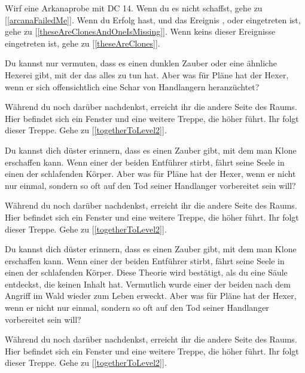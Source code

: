 Wirf eine Arkanaprobe mit DC 14. Wenn du es nicht schaffst, gehe zu [\ref{arcanaFailedMe}]. Wenn du Erfolg hast, und das Ereignis ,  oder  eingetreten ist, gehe zu [\ref{theseAreClonesAndOneIsMissing}]. Wenn keins dieser Ereignisse eingetreten ist, gehe zu [\ref{theseAreClones}].


Du kannst nur vermuten, dass es einen dunklen Zauber oder eine ähnliche Hexerei gibt, mit der das alles zu tun hat. Aber was für Pläne hat der Hexer, wenn er sich offensichtlich eine Schar von Handlangern heranzüchtet?

Während du noch darüber nachdenkst, erreicht ihr die andere Seite des Raums. Hier befindet sich ein Fenster und eine weitere Treppe, die höher führt. Ihr folgt dieser Treppe.
Gehe zu [\ref{togetherToLevel2}].


Du kannst dich düster erinnern, dass es einen Zauber gibt, mit dem man Klone erschaffen kann. Wenn einer der beiden Entführer stirbt, fährt seine Seele in einen der schlafenden Körper. Aber was für Pläne hat der Hexer, wenn er nicht nur einmal, sondern so oft auf den Tod seiner Handlanger vorbereitet sein will?

Während du noch darüber nachdenkst, erreicht ihr die andere Seite des Raums. Hier befindet sich ein Fenster und eine weitere Treppe, die höher führt. Ihr folgt dieser Treppe.
Gehe zu [\ref{togetherToLevel2}].


Du kannst dich düster erinnern, dass es einen Zauber gibt, mit dem man Klone erschaffen kann. Wenn einer der beiden Entführer stirbt, fährt seine Seele in einen der schlafenden Körper. Diese Theorie wird bestätigt, als du eine Säule entdeckst, die keinen Inhalt hat. Vermutlich wurde einer der beiden nach dem Angriff im Wald wieder zum Leben erweckt. Aber was für Pläne hat der Hexer, wenn er nicht nur einmal, sondern so oft auf den Tod seiner Handlanger vorbereitet sein will?

Während du noch darüber nachdenkst, erreicht ihr die andere Seite des Raums. Hier befindet sich ein Fenster und eine weitere Treppe, die höher führt. Ihr folgt dieser Treppe.
Gehe zu [\ref{togetherToLevel2}].



